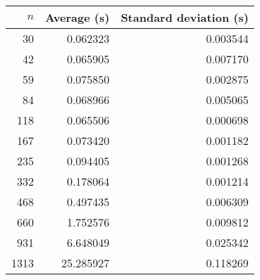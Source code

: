 \begin{tabular}{rrr}
$n$ & Average (s) & Standard deviation (s)\\\hline
30 & 0.062323 & 0.003544\\
42 & 0.065905 & 0.007170\\
59 & 0.075850 & 0.002875\\
84 & 0.068966 & 0.005065\\
118 & 0.065506 & 0.000698\\
167 & 0.073420 & 0.001182\\
235 & 0.094405 & 0.001268\\
332 & 0.178064 & 0.001214\\
468 & 0.497435 & 0.006309\\
660 & 1.752576 & 0.009812\\
931 & 6.648049 & 0.025342\\
1313 & 25.285927 & 0.118269\\
\end{tabular}

